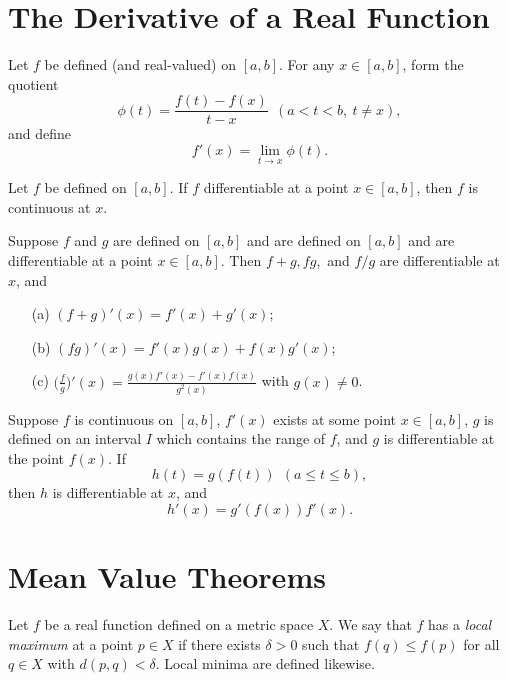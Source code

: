 \documentclass[11pt,a4paper]{book}
\begin{document}
\section{The Derivative of a Real Function}

\begin{definition}[5.1]
    Let \( f  \) be defined (and real-valued) on \( [a,b] \). For any \( x \in [a,b] \), form the quotient 
    \[  \phi(t) = \frac{ f(t) - f(x)  }{  t - x  } \ \ (a < t < b, \  t \neq x ),   \]
    and define
    \[  f'(x) = \lim_{ t \to x }  \phi(t). \]
\end{definition}

\begin{theorem}[5.2]
    Let \( f  \) be defined on \( [a,b] \). If \( f  \) differentiable at a point \( x \in [a,b] \), then \( f  \) is continuous at \( x  \).   
\end{theorem}

\begin{theorem}[5.3]
    Suppose \( f  \) and \( g  \) are defined on \( [a,b] \) and are defined on \( [a,b] \) and are differentiable at a point \( x \in [a,b] \). Then \( f + g, fg, \) and \( f/g \) are differentiable at \( x  \), and
    \begin{enumerate}
        \item[(a)] \( (f+g)'(x) = f'(x) + g'(x)  \);
        \item[(b)] \( (fg)'(x) = f'(x) g(x) + f(x) g'(x) \);
        \item[(c)] \( \Big(  \frac{ f  }{ g }  \Big)'(x) = \frac{ g(x) f'(x) - f'(x) f(x)  }{  g^{2}(x) }  \) with \( g(x) \neq 0  \).
    \end{enumerate}
\end{theorem}

\begin{theorem}[5.5]
    Suppose \( f  \) is continuous on \( [a,b] \), \( f'(x) \) exists at some point \( x \in [a,b] \), \( g  \) is defined on an interval \( I  \) which contains the range of \( f  \), and \( g  \) is differentiable at the point \( f(x) \). If 
    \[  h(t) = g(f(t)) \ \ (a \leq t \leq b), \]
    then \( h  \) is differentiable at \( x  \), and
    \[  h'(x) = g'(f(x)) f'(x). \]
\end{theorem}

\section{Mean Value Theorems}

\begin{definition}[5.7]
    Let \( f  \) be a real function defined on a metric space \( X  \). We say that \( f  \) has a \textit{local maximum} at a point \( p \in X  \) if there exists \( \delta > 0  \) such that \( f(q) \leq f(p) \) for all \( q \in X  \) with \( d(p,q) < \delta \). Local minima are defined likewise. 
\end{definition}
\end{document}
